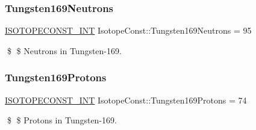 \subsubsection{\texorpdfstring{Tungsten169\+Neutrons}{Tungsten169Neutrons}}
{\footnotesize\ttfamily \mbox{\hyperlink{group___isotope_const-_macros_ga5f18360b3e99483a35c32d789e62621c}{I\+S\+O\+T\+O\+P\+E\+C\+O\+N\+S\+T\+\_\+\+I\+NT}} Isotope\+Const\+::\+Tungsten169\+Neutrons = 95}

\$ \$ Neutrons in Tungsten-\/169. \mbox{\label{group___isotope_const-_tungsten-_w169_ga63506f1555696400feaca1c1d46a407b}} 
\subsubsection{\texorpdfstring{Tungsten169\+Protons}{Tungsten169Protons}}
{\footnotesize\ttfamily \mbox{\hyperlink{group___isotope_const-_macros_ga5f18360b3e99483a35c32d789e62621c}{I\+S\+O\+T\+O\+P\+E\+C\+O\+N\+S\+T\+\_\+\+I\+NT}} Isotope\+Const\+::\+Tungsten169\+Protons = 74}

\$ \$ Protons in Tungsten-\/169. 